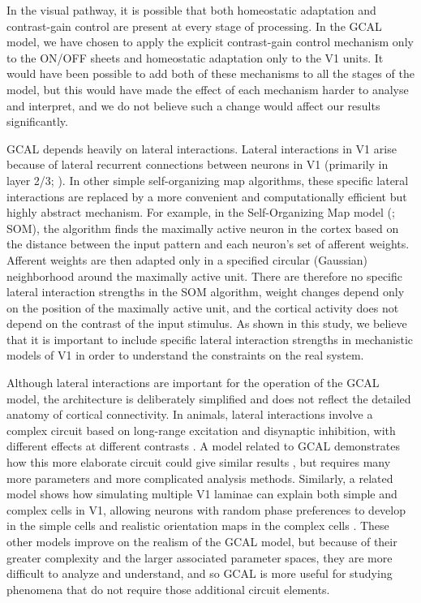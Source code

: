 \documentclass{article}
\begin{document}
In the visual pathway, it is possible that both homeostatic adaptation
and contrast-gain control are present at every stage of processing. In
the GCAL model, we have chosen to apply the explicit contrast-gain
control mechanism only to the ON/OFF sheets and homeostatic adaptation
only to the V1 units. It would have been possible to add both of these
mechanisms to all the stages of the model, but this would have made
the effect of each mechanism harder to analyse and interpret, and we
do not believe such a change would affect our results
significantly.

GCAL depends heavily on lateral interactions.  Lateral interactions in
V1 arise because of lateral recurrent connections between neurons in
V1 (primarily in layer 2/3; \citealp{Gilbert1990,Bosking1997}). In
other simple self-organizing map algorithms, these specific lateral
interactions are replaced by a more convenient and computationally
efficient but highly abstract mechanism. For example, in the
Self-Organizing Map model
(\citealt{Obermayer1990,kohonen:original,farley:jn07}; SOM), the
algorithm finds the maximally active neuron in the cortex based on the
distance between the input pattern and each neuron's set of afferent
weights.  Afferent weights are then adapted only in a specified
circular (Gaussian) neighborhood around the maximally active
unit. There are therefore no specific lateral interaction strengths in
the SOM algorithm, weight changes depend only on the position of the
maximally active unit, and the cortical activity does not depend on
the contrast of the input stimulus. As shown in this study, we believe
that it is important to include specific lateral interaction strengths
in mechanistic models of V1 in order to understand the constraints on
the real system.

Although lateral interactions are important for the operation of the
GCAL model, the architecture is deliberately simplified and does not
reflect the detailed anatomy of cortical connectivity. In animals,
lateral interactions involve a complex circuit based on long-range
excitation and disynaptic inhibition, with different effects at
different contrasts \citep{Hirsch1991,Weliky1995}.  A model related
to GCAL demonstrates how this more elaborate circuit could give
similar results \citep{law:phd09}, but requires many more parameters
and more complicated analysis methods.  Similarly, a related model
shows how simulating multiple V1 laminae can explain both simple and
complex cells in V1, allowing neurons with random phase preferences to
develop in the simple cells and realistic orientation maps in the
complex cells \citep{antolik:fcn11}.  These other models improve on the
realism of the GCAL model, but because of their greater complexity and
the larger associated parameter spaces, they are more difficult to
analyze and understand, and so GCAL is more useful for studying
phenomena that do not require those additional circuit elements.
\end{document}
